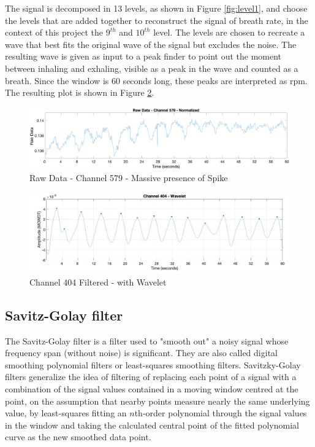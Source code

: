 The signal is decomposed in 13 levels, as shown in Figure \ref{fig:level1}, and choose the levels that are added together to reconstruct the signal of breath rate, in the context of this project the $9^{th}$ and $10^{th}$ level. The levels are chosen to recreate a wave that best fits the original wave of the signal but excludes the noise.
The resulting wave is given as input to a peak finder to point out the moment between inhaling and exhaling, visible as a peak in the wave and counted as a breath. Since the window is 60 seconds long, these peaks are interpreted as rpm. The resulting plot is shown in Figure \ref{fig:404Filt}.
\begin{figure}[H]
    \centering
    \includegraphics[width=\textwidth]{img/579.pdf}
    \caption{Raw Data - Channel 579 - Massive presence of Spike}
    \label{fig:404}
\end{figure}

\begin{figure}[H]
    \centering
    \includegraphics[width=\textwidth]{img/404_wave.jpg}
    \caption{Channel 404 Filtered - with Wavelet}
    \label{fig:404Filt}
\end{figure}


\subsection{Savitz-Golay filter} \label{sg}


The Savitz-Golay filter is a filter used to "smooth out" a noisy signal whose frequency span (without noise) is significant. 
They are also called digital smoothing polynomial filters or least-squares smoothing filters. 
Savitzky-Golay filters generalize the idea of filtering of replacing each point of a signal with a combination of the signal values contained in a moving window centred at the point, on the assumption that nearby points measure nearly the same underlying value, by least-squares fitting an $n$th-order polynomial through the signal values in the window and taking the calculated central point of the fitted polynomial curve as the new smoothed data point.


